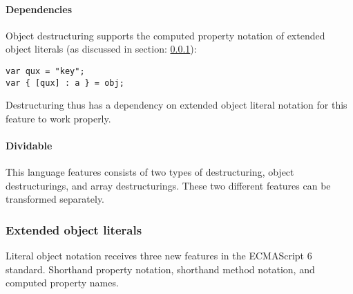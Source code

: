 \documentclass[10pt,a4paper]{article}
\begin{document}
\paragraph{Dependencies}
Object destructuring supports the computed property notation of extended object literals (as discussed in section: \ref{object-literals}): 

\begin{lstlisting}
var qux = "key";
var { [qux] : a } = obj;
\end{lstlisting}

Destructuring thus has a dependency on extended object literal notation for this feature to work properly.

\paragraph{Dividable}
This language features consists of two types of destructuring, object destructurings, and array destructurings. These two different features can be transformed separately. 

\subsubsection{Extended object literals} \label{object-literals}
Literal object notation receives three new features in the ECMAScript 6 standard\cite[12.2.5]{SpecJS}. Shorthand property notation, shorthand method notation, and computed property names.
\end{document}

